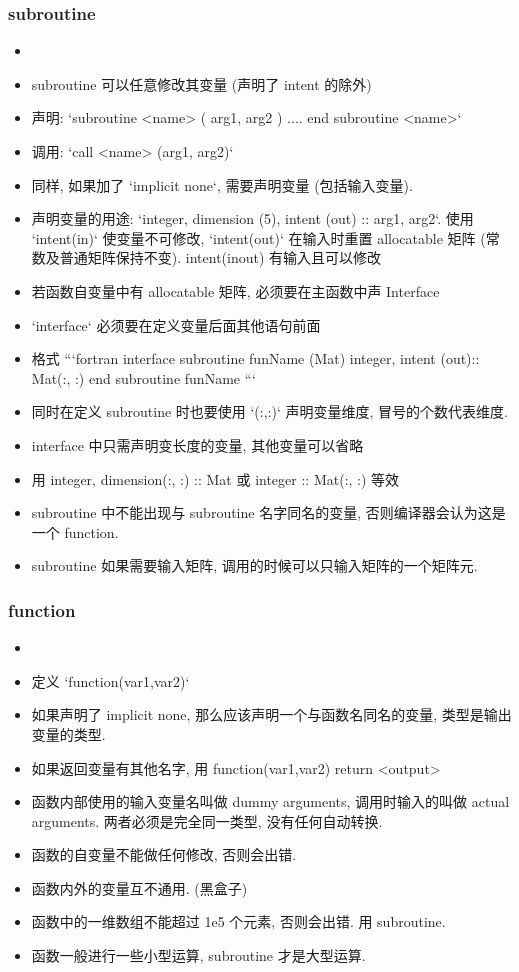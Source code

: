 \subsubsection{subroutine}

\begin{itemize}
\item \item subroutine 可以任意修改其变量 (声明了 intent 的除外)
\item 声明: `subroutine <name> ( arg1, arg2 ) .... end subroutine  <name>`
\item 调用:  `call <name> (arg1, arg2)`
\item 同样, 如果加了 `implicit none`,  需要声明变量 (包括输入变量).
\item 声明变量的用途: `integer, dimension (5), intent (out) :: arg1, arg2`. 使用 `intent(in)` 使变量不可修改, `intent(out)` 在输入时重置 allocatable 矩阵 (常数及普通矩阵保持不变). intent(inout) 有输入且可以修改
\item 若函数自变量中有 allocatable 矩阵, 必须要在主函数中声 Interface
\item `interface` 必须要在定义变量后面其他语句前面
\item 格式
```fortran
interface
    subroutine funName (Mat)
         integer,  intent (out):: Mat(:, :)
end subroutine funName
```
\item 同时在定义 subroutine 时也要使用 `(:,:)` 声明变量维度, 冒号的个数代表维度.
\item interface 中只需声明变长度的变量, 其他变量可以省略
\item 用 integer, dimension(:, :) :: Mat 或 integer :: Mat(:, :) 等效
\item subroutine 中不能出现与 subroutine 名字同名的变量, 否则编译器会认为这是一个 function.
\item subroutine 如果需要输入矩阵, 调用的时候可以只输入矩阵的一个矩阵元.
\end{itemize}

\subsubsection{function}
\begin{itemize}
\item \item 定义 `function(var1,var2)`
\item 如果声明了 implicit none, 那么应该声明一个与函数名同名的变量, 类型是输出变量的类型.
\item 如果返回变量有其他名字, 用 function(var1,var2) return <output>
\item 函数内部使用的输入变量名叫做 dummy arguments, 调用时输入的叫做 actual arguments. 两者必须是完全同一类型, 没有任何自动转换.
\item 函数的自变量不能做任何修改, 否则会出错.
\item 函数内外的变量互不通用. (黑盒子)
\item 函数中的一维数组不能超过 1e5 个元素, 否则会出错. 用 subroutine.
\item 函数一般进行一些小型运算, subroutine 才是大型运算.
\end{itemize}
